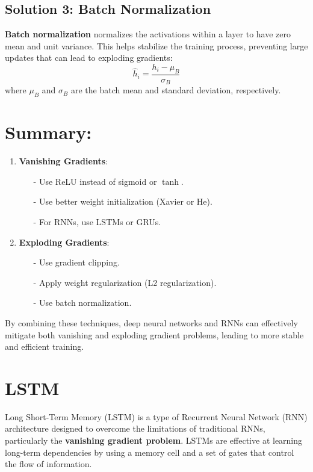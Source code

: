 \documentclass[10pt]{article}
\begin{document}
\subsection{ Solution 3: Batch Normalization}
{\bf Batch normalization} normalizes the activations within a layer to have zero mean and unit variance. This helps stabilize the training process, preventing large updates that can lead to exploding gradients:
\[
\hat{h}_i = \frac{h_i - \mu_B}{\sigma_B}
\]
where \( \mu_B \) and \( \sigma_B \) are the batch mean and standard deviation, respectively.

\section{ Summary:}

\begin{enumerate}
   \item {\bf Vanishing Gradients}:
      \begin{itemize}
         \item [-] Use ReLU instead of sigmoid or \( \tanh \).
         \item [-] Use better weight initialization (Xavier or He).
         \item [-] For RNNs, use LSTMs or GRUs.
      \end{itemize}
   
   \item {\bf Exploding Gradients}:
      \begin{itemize}
         \item [-] Use gradient clipping.
         \item [-] Apply weight regularization (L2 regularization).
         \item [-] Use batch normalization.
      \end{itemize}
\end{enumerate}

By combining these techniques, deep neural networks and RNNs can effectively mitigate both vanishing and exploding gradient problems, leading to more stable and efficient training.


\section{LSTM}

Long Short-Term Memory (LSTM) is a type of Recurrent Neural Network (RNN) architecture designed to overcome the limitations of traditional RNNs, particularly the {\bf vanishing gradient problem}. LSTMs are effective at learning long-term dependencies by using a memory cell and a set of gates that control the flow of information.
\end{document}
